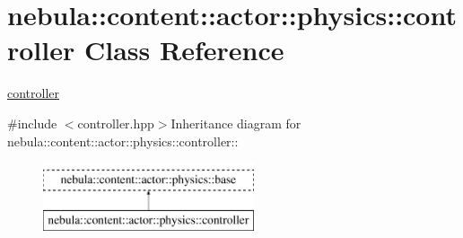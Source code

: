 \hypertarget{classnebula_1_1content_1_1actor_1_1physics_1_1controller}{
\section{nebula::content::actor::physics::controller Class Reference}
\label{classnebula_1_1content_1_1actor_1_1physics_1_1controller}
}


\hyperlink{classnebula_1_1content_1_1actor_1_1physics_1_1controller}{controller}  


{\ttfamily \#include $<$controller.hpp$>$}Inheritance diagram for nebula::content::actor::physics::controller::\begin{figure}[H]
\begin{center}
\leavevmode
\includegraphics[height=2cm]{classnebula_1_1content_1_1actor_1_1physics_1_1controller}
\end{center}
\end{figure}
